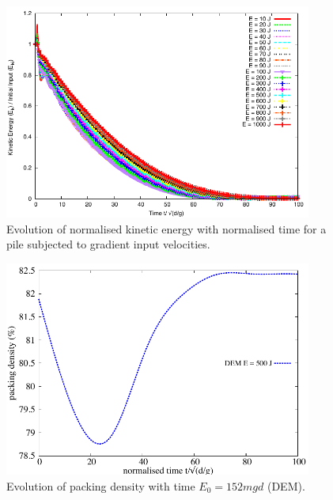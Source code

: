 \begin{figure}[tbhp]
\centering
\includegraphics[width=0.9\textwidth]{Normalised_Energy_Time_Slope_DEM}
\caption{Evolution of normalised kinetic energy with normalised time for a pile 
subjected to gradient input velocities.}
\label{fig:Normalised_Energy_Time_Slope_DEM}
\end{figure}

\begin{figure}[tbhp]
\centering
\includegraphics[width=0.9\textwidth]{voro_500}
\caption{Evolution of packing density with time $E_0 = 152 mgd$ (DEM).}
\label{fig:voro_500}
\end{figure}

